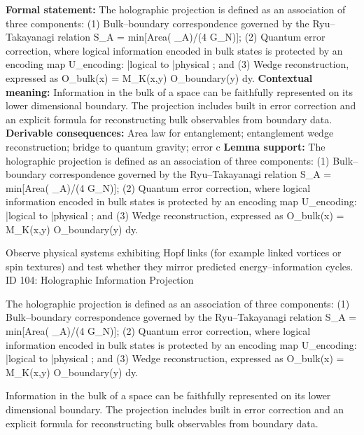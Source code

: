 \begingroup\footnotesize\setlength{\emergencystretch}{3em}\sloppy
\textbf{Formal statement:} The holographic projection is defined as an association of three components: (1) Bulk--boundary correspondence governed by the Ryu--Takayanagi relation S\_A = min[Area( \_A)/(4 G\_N)]; (2) Quantum error correction, where logical information encoded in bulk states is protected by an encoding map U\_encoding: |logical  to |physical ; and (3) Wedge reconstruction, expressed as O\_bulk(x) =   M\_K(x,y) O\_boundary(y) dy.
\textbf{Contextual meaning:} Information in the bulk of a space can be faithfully represented on its lower dimensional boundary. The projection includes built in error correction and an explicit formula for reconstructing bulk observables from boundary data.
\textbf{Derivable consequences:} Area law for entanglement; entanglement wedge reconstruction; bridge to quantum gravity; error c
\textbf{Lemma support:} The holographic projection is defined as an association of three components: (1) Bulk--boundary correspondence governed by the Ryu--Takayanagi relation S\_A = min[Area( \_A)/(4 G\_N)]; (2) Quantum error correction, where logical information encoded in bulk states is protected by an encoding map U\_encoding: |logical  to |physical ; and (3) Wedge reconstruction, expressed as O\_bulk(x) =   M\_K(x,y) O\_boundary(y) dy.\par
\endgroup

Observe physical systems exhibiting Hopf links (for example linked vortices or spin textures) and test whether they mirror predicted energy--information cycles. ID 104: Holographic Information Projection

The holographic projection is defined as an association of three components: (1) Bulk--boundary correspondence governed by the Ryu--Takayanagi relation S\_A = min[Area( \_A)/(4 G\_N)]; (2) Quantum error correction, where logical information encoded in bulk states is protected by an encoding map U\_encoding: |logical  to |physical ; and (3) Wedge reconstruction, expressed as O\_bulk(x) =   M\_K(x,y) O\_boundary(y) dy.

Information in the bulk of a space can be faithfully represented on its lower dimensional boundary. The projection includes built in error correction and an explicit formula for reconstructing bulk observables from boundary data.
\endgroup

